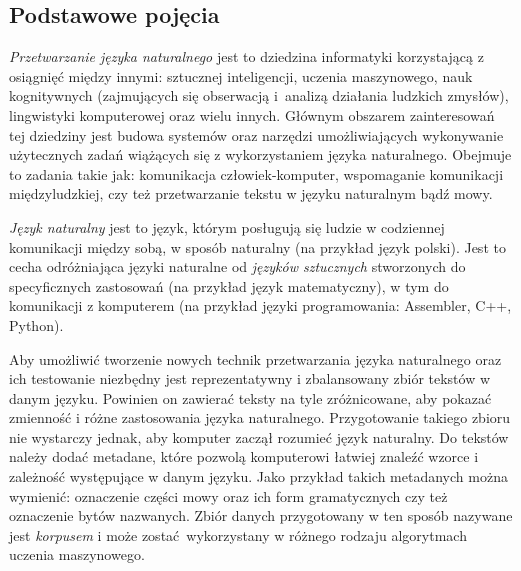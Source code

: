 \documentclass[a4paper, twoside, 12pt]{report}
\begin{document}
        \subsection{Podstawowe pojęcia}
            \emph{Przetwarzanie języka naturalnego} jest to dziedzina informatyki korzystającą z osiągnięć
            między innymi: sztucznej inteligencji, uczenia maszynowego, nauk kognitywnych
            (zajmujących się obserwacją i~analizą działania ludzkich zmysłów), lingwistyki komputerowej oraz
            wielu innych. Głównym obszarem zainteresowań tej dziedziny jest budowa systemów oraz narzędzi
            umożliwiających wykonywanie użytecznych zadań wiążących się z wykorzystaniem języka naturalnego.
            Obejmuje to zadania takie jak: komunikacja człowiek-komputer, wspomaganie komunikacji międzyludzkiej,
            czy też przetwarzanie tekstu w języku naturalnym bądź mowy\cite{SPEECHANDLANGUAGEPROCESSING}.

            \emph{Język naturalny} jest to język,
            którym posługują się ludzie w codziennej komunikacji między sobą, w sposób naturalny (na przykład
            język polski). Jest to cecha odróżniająca języki naturalne od \emph{języków sztucznych} stworzonych
            do specyficznych zastosowań (na przykład język matematyczny), w tym do komunikacji z komputerem
            (na przykład języki programowania: Assembler, C++, Python).

            Aby umożliwić tworzenie nowych technik
            przetwarzania języka naturalnego oraz ich testowanie niezbędny jest reprezentatywny i zbalansowany
            zbiór tekstów w danym języku. Powinien on zawierać teksty na tyle zróżnicowane, aby pokazać zmienność
            i różne zastosowania języka naturalnego. Przygotowanie takiego zbioru nie wystarczy jednak, aby
            komputer zaczął rozumieć język naturalny. Do tekstów należy dodać metadane, które pozwolą komputerowi
            łatwiej znaleźć wzorce i zależność występujące w danym języku. Jako przykład takich metadanych można
            wymienić: oznaczenie części mowy oraz ich form gramatycznych czy też oznaczenie bytów nazwanych.
            Zbiór danych przygotowany w ten sposób nazywane jest \emph{korpusem}\cite{NATURALLANGUGEANNOTATION}
            i może zostać wykorzystany w różnego rodzaju algorytmach uczenia maszynowego.
\end{document}
